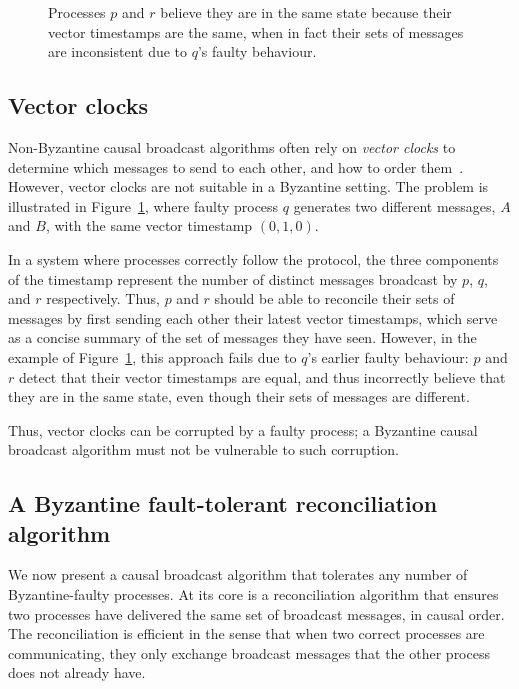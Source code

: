 \documentclass[a4paper,anonymous,USenglish]{lipics-v2019}
\begin{document}
\begin{figure}
    \centering
    
    \caption{Processes $p$ and $r$ believe they are in the same state because their vector timestamps are the same, when in fact their sets of messages are inconsistent due to $q$'s faulty behaviour.}
    \label{fig:vectorclocks}
\end{figure}

\subsection{Vector clocks}

Non-Byzantine causal broadcast algorithms often rely on \emph{vector clocks} to determine which messages to send to each other, and how to order them~\cite{Birman:1991el,Schwarz:1994}.
However, vector clocks are not suitable in a Byzantine setting.
The problem is illustrated in Figure~\ref{fig:vectorclocks}, where faulty process $q$ generates two different messages, $A$ and $B$, with the same vector timestamp $(0, 1, 0)$.

In a system where processes correctly follow the protocol, the three components of the timestamp represent the number of distinct messages broadcast by $p$, $q$, and $r$ respectively.
Thus, $p$ and $r$ should be able to reconcile their sets of messages by first sending each other their latest vector timestamps, which serve as a concise summary of the set of messages they have seen.
However, in the example of Figure~\ref{fig:vectorclocks}, this approach fails due to $q$'s earlier faulty behaviour: $p$ and $r$ detect that their vector timestamps are equal, and thus incorrectly believe that they are in the same state, even though their sets of messages are different.

Thus, vector clocks can be corrupted by a faulty process; a Byzantine causal broadcast algorithm must not be vulnerable to such corruption.

\subsection{A Byzantine fault-tolerant reconciliation algorithm}\label{sec:algorithm1}

We now present a causal broadcast algorithm that tolerates any number of Byzantine-faulty processes.
At its core is a reconciliation algorithm that ensures two processes have delivered the same set of broadcast messages, in causal order.
The reconciliation is efficient in the sense that when two correct processes are communicating, they only exchange broadcast messages that the other process does not already have.
\end{document}
